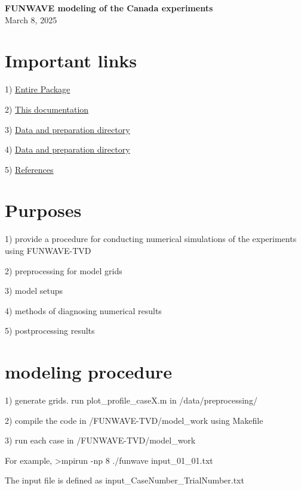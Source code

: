 \documentclass[preprint,10pt]{elsarticle}
\begin{document}


\begin{center}
{\bf \Huge FUNWAVE modeling of the Canada experiments}
\\
\vspace{1cm}
March 8, 2025
\end{center}

\section*{Important links}

1) \href{https://github.com/fengyanshi/Canada_Experiment}{Entire Package}

2)  \href{https://github.com/fengyanshi/Canada_Experiment/tree/main/documentation}{This documentation}

3)  \href{https://github.com/fengyanshi/Canada_Experiment/tree/main/data}{Data and preparation directory}

4)  \href{https://github.com/fengyanshi/Canada_Experiment/tree/main/data}{Data and preparation directory}

5)  \href{https://github.com/fengyanshi/Canada_Experiment/tree/main/references}{References}

\section*{Purposes}

1) provide a procedure for conducting numerical simulations of the experiments using FUNWAVE-TVD

2) preprocessing for model grids

3) model setups

4) methods of diagnosing numerical results

5) postprocessing results
  

\section*{modeling procedure}

1) generate grids. run plot\_profile\_caseX.m in /data/preprocessing/

2) compile the code in /FUNWAVE-TVD/model\_work using Makefile

3) run each case in /FUNWAVE-TVD/model\_work 
 
 For example, >mpirun -np 8 ./funwave input\_01\_01.txt 
 
 The input file is defined as input\_CaseNumber\_TrialNumber.txt
 
\end{document}
